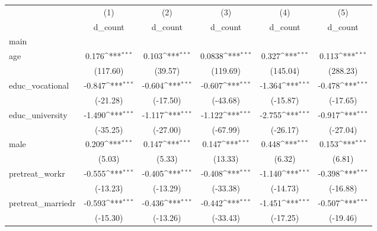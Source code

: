 {
\def\sym#1{\ifmmode^{#1}\else\(^{#1}\)\fi}
\begin{tabular}{l*{5}{c}}
\hline\hline
            &\multicolumn{1}{c}{(1)}&\multicolumn{1}{c}{(2)}&\multicolumn{1}{c}{(3)}&\multicolumn{1}{c}{(4)}&\multicolumn{1}{c}{(5)}\\
            &\multicolumn{1}{c}{d\_count}&\multicolumn{1}{c}{d\_count}&\multicolumn{1}{c}{d\_count}&\multicolumn{1}{c}{d\_count}&\multicolumn{1}{c}{d\_count}\\
\hline
main        &                     &                     &                     &                     &                     \\
age         &       0.176\sym{***}&       0.103\sym{***}&      0.0838\sym{***}&       0.327\sym{***}&       0.113\sym{***}\\
            &    (117.60)         &     (39.57)         &    (119.69)         &    (145.04)         &    (288.23)         \\
[1em]
educ\_vocational&      -0.847\sym{***}&      -0.604\sym{***}&      -0.607\sym{***}&      -1.364\sym{***}&      -0.478\sym{***}\\
            &    (-21.28)         &    (-17.50)         &    (-43.68)         &    (-15.87)         &    (-17.65)         \\
[1em]
educ\_university&      -1.490\sym{***}&      -1.117\sym{***}&      -1.122\sym{***}&      -2.755\sym{***}&      -0.917\sym{***}\\
            &    (-35.25)         &    (-27.00)         &    (-67.99)         &    (-26.17)         &    (-27.04)         \\
[1em]
male        &       0.209\sym{***}&       0.147\sym{***}&       0.147\sym{***}&       0.448\sym{***}&       0.153\sym{***}\\
            &      (5.03)         &      (5.33)         &     (13.33)         &      (6.32)         &      (6.81)         \\
[1em]
pretreat\_workr&      -0.555\sym{***}&      -0.405\sym{***}&      -0.408\sym{***}&      -1.140\sym{***}&      -0.398\sym{***}\\
            &    (-13.23)         &    (-13.29)         &    (-33.38)         &    (-14.73)         &    (-16.88)         \\
[1em]
pretreat\_marriedr&      -0.593\sym{***}&      -0.436\sym{***}&      -0.442\sym{***}&      -1.451\sym{***}&      -0.507\sym{***}\\
            &    (-15.30)         &    (-13.26)         &    (-33.43)         &    (-17.25)         &    (-19.46)         \\

\end{tabular}}
